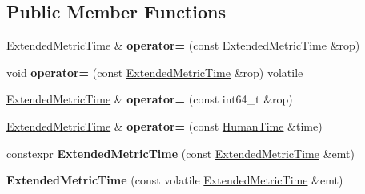 \subsection*{Public Member Functions}
\begin{DoxyCompactItemize}
\item 
\mbox{\label{classtime_1_1_extended_metric_time_a6db490ce9c7fd13d2fe734ce1a6d1957}} 
\mbox{\hyperlink{classtime_1_1_extended_metric_time}{Extended\+Metric\+Time}} \& {\bfseries operator=} (const \mbox{\hyperlink{classtime_1_1_extended_metric_time}{Extended\+Metric\+Time}} \&rop)
\item 
\mbox{\label{classtime_1_1_extended_metric_time_ab98d0dca4a7bf7c500c3537b397fd5ca}} 
void {\bfseries operator=} (const \mbox{\hyperlink{classtime_1_1_extended_metric_time}{Extended\+Metric\+Time}} \&rop) volatile
\item 
\mbox{\label{classtime_1_1_extended_metric_time_a206ed51247f5983c7d9443f95a623541}} 
\mbox{\hyperlink{classtime_1_1_extended_metric_time}{Extended\+Metric\+Time}} \& {\bfseries operator=} (const int64\+\_\+t \&rop)
\item 
\mbox{\label{classtime_1_1_extended_metric_time_a9b39ae3eef07933a67a7238160f08b9f}} 
\mbox{\hyperlink{classtime_1_1_extended_metric_time}{Extended\+Metric\+Time}} \& {\bfseries operator=} (const \mbox{\hyperlink{classtime_1_1_human_time}{Human\+Time}} \&time)
\item 
\mbox{\label{classtime_1_1_extended_metric_time_a8e043f272ca581e66548d42d952785f4}} 
constexpr {\bfseries Extended\+Metric\+Time} (const \mbox{\hyperlink{classtime_1_1_extended_metric_time}{Extended\+Metric\+Time}} \&emt)
\item 
\mbox{\label{classtime_1_1_extended_metric_time_a0960307dca270f504853f8bc5b967f4f}} 
{\bfseries Extended\+Metric\+Time} (const volatile \mbox{\hyperlink{classtime_1_1_extended_metric_time}{Extended\+Metric\+Time}} \&emt)
\item 
\mbox{\label{classtime_1_1_extended_metric_time_a22efdc8caad863d7c0f43b94762bf795}} 

\end{DoxyCompactItemize}
